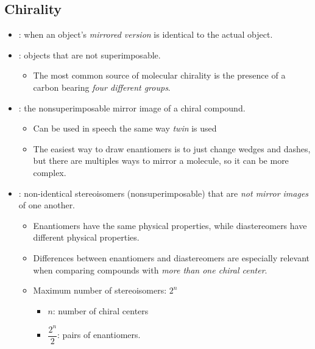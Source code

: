 \documentclass{inVerba-notes}
\begin{document}
\begin{itemize}
        \subsection{Chirality}
        \begin{itemize}
            \item {}: when an object's \emph{mirrored version} is identical to the actual object.
            \item {}: objects that are not superimposable.
                \begin{itemize}
                    \item The most common source of molecular chirality is the presence of a carbon bearing \emph{four different groups}. 
                \end{itemize}
            \item {}: the nonsuperimposable mirror image of a chiral compound.
                \begin{itemize}
                    \item Can be used in speech the same way \emph{twin} is used
                    \item The easiest way to draw enantiomers is to just change wedges and dashes, but there are multiples ways to mirror a molecule, so it can be more complex.
                \end{itemize}
            \item {}: non-identical stereoisomers (nonsuperimposable) that are \emph{not mirror images} of one another. 
                \begin{itemize}
                        \item  Enantiomers have the same physical properties, while diastereomers have different physical properties.
                        \item Differences between enantiomers and diastereomers are especially relevant when comparing compounds with \emph{more than one chiral center}.
                        \item Maximum number of stereoisomers: \emph{\(2^n\)}
                    \begin{itemize}
                        \item \(n\): number of chiral centers
                        \item \(\dfrac{2^n}{2}\): pairs of enantiomers.
                    \end{itemize}
                \end{itemize}
        \end{itemize}
    \end{itemize}
\end{document}
